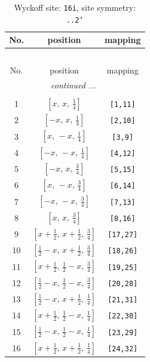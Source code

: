 \documentclass[fleqn,8pt]{jsarticle}
\begin{document}
\begin{longtable}{ccc}
\caption{Wyckoff site: {\tt 16i}, site symmetry: {\tt ..2'}}
 \\
 \hline \hline
No. & position & mapping \\ \hline \endfirsthead

\multicolumn{2}{l}{\tablename\ \thetable{}} \\
 \hline \hline
No. & position & mapping \\ \hline \endhead

 \hline \hline
\multicolumn{2}{r}{\footnotesize\it continued ...} \\ \endfoot

 \hline \hline
\multicolumn{2}{r}{} \\ \endlastfoot

1 & $\left[ x,\, x,\, \frac{1}{4} \right]$ & {\tt [1,11]} \\ \hline
2 & $\left[ - x,\, x,\, \frac{1}{4} \right]$ & {\tt [2,10]} \\ \hline
3 & $\left[ x,\, - x,\, \frac{1}{4} \right]$ & {\tt [3,9]} \\ \hline
4 & $\left[ - x,\, - x,\, \frac{1}{4} \right]$ & {\tt [4,12]} \\ \hline
5 & $\left[ - x,\, x,\, \frac{3}{4} \right]$ & {\tt [5,15]} \\ \hline
6 & $\left[ x,\, - x,\, \frac{3}{4} \right]$ & {\tt [6,14]} \\ \hline
7 & $\left[ - x,\, - x,\, \frac{3}{4} \right]$ & {\tt [7,13]} \\ \hline
8 & $\left[ x,\, x,\, \frac{3}{4} \right]$ & {\tt [8,16]} \\ \hline
9 & $\left[ x + \frac{1}{2},\, x + \frac{1}{2},\, \frac{3}{4} \right]$ & {\tt [17,27]} \\ \hline
10 & $\left[ \frac{1}{2} - x,\, x + \frac{1}{2},\, \frac{3}{4} \right]$ & {\tt [18,26]} \\ \hline
11 & $\left[ x + \frac{1}{2},\, \frac{1}{2} - x,\, \frac{3}{4} \right]$ & {\tt [19,25]} \\ \hline
12 & $\left[ \frac{1}{2} - x,\, \frac{1}{2} - x,\, \frac{3}{4} \right]$ & {\tt [20,28]} \\ \hline
13 & $\left[ \frac{1}{2} - x,\, x + \frac{1}{2},\, \frac{1}{4} \right]$ & {\tt [21,31]} \\ \hline
14 & $\left[ x + \frac{1}{2},\, \frac{1}{2} - x,\, \frac{1}{4} \right]$ & {\tt [22,30]} \\ \hline
15 & $\left[ \frac{1}{2} - x,\, \frac{1}{2} - x,\, \frac{1}{4} \right]$ & {\tt [23,29]} \\ \hline
16 & $\left[ x + \frac{1}{2},\, x + \frac{1}{2},\, \frac{1}{4} \right]$ & {\tt [24,32]} \\
\end{longtable}
\end{document}
